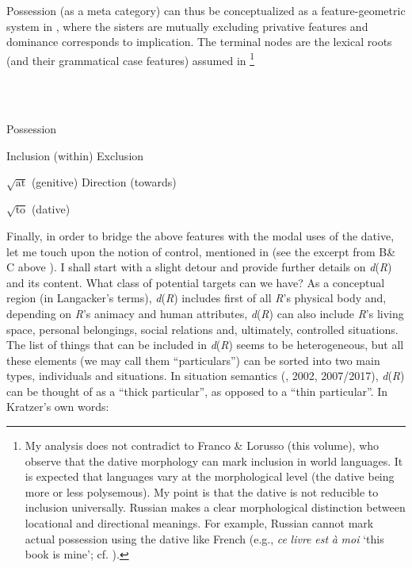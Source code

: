 \documentclass[output=paper,modfonts,nonflat]{langsci/langscibook}
\begin{document}
Possession (as a meta category) can thus be conceptualized as a feature-geometric system in , where the sisters are mutually excluding privative features and dominance corresponds to implication. The terminal nodes are the lexical roots (and their grammatical case features) assumed in \footnote{My analysis does not contradict to Franco \& Lorusso (this volume), who observe that the dative morphology can mark inclusion in world languages. It is expected that languages vary at the morphological level (the dative being more or less polysemous). My point is that the dative is not reducible to inclusion universally. Russian makes a clear morphological distinction between locational and directional meanings. For example, Russian cannot mark actual possession using the dative like French (e.g., \textit{ce} \textit{livre} \textit{est} \textit{à} \textit{moi} ‘this book is mine’; cf. ).      }  

\ea%
    \label{ex:key:28}
    \gll\\
        \\
    \glt
    \z

          Possession

  Inclusion (within)    Exclusion

   $\sqrt{\text{at}}$ (genitive)    Direction (towards)  

     $\sqrt{\text{to}}$ (dative)

Finally, in order to bridge the above features with the modal uses of the dative, let me touch upon the notion of control, mentioned in  (see the excerpt from B\& C above ). I shall start with a slight detour and provide further details on \textit{d}(\textit{R}) and its content. What class of potential targets can we have? As a conceptual region (in Langacker’s terms), \textit{d}(\textit{R}) includes first of all \textit{R}’s physical body and, depending on \textit{R}’s animacy and human attributes, \textit{d}(\textit{R}) can also include \textit{R}’s living space, personal belongings, social relations and, ultimately, controlled situations. The list of things that can be included in \textit{d}(\textit{R}) seems to be heterogeneous, but all these elements (we may call them “particulars”) can be sorted into two main types, individuals and situations. In situation semantics (\citealt{Kratzer1989}, 2002, 2007/2017), \textit{d}(\textit{R}) can be thought of as a “thick particular”, as opposed to a “thin particular”. In Kratzer’s own words: 
\end{document}
